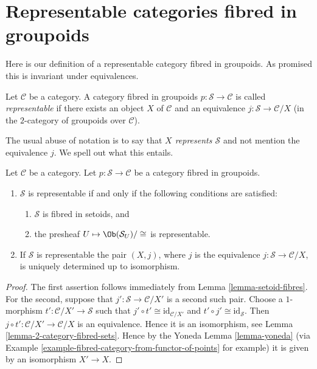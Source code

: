 \section{Representable categories fibred in groupoids}
\label{section-representable-fibred-groupoids}

\noindent
Here is our definition of a representable category fibred in groupoids.
As promised this is invariant under equivalences.

\begin{definition}
\label{definition-representable-fibred-category}
Let $\mathcal{C}$ be a category.
A category fibred in groupoids $p : \mathcal{S} \to \mathcal{C}$ is
called {\it representable} if there exists an object
$X$ of $\mathcal{C}$ and an equivalence $j : \mathcal{S} \to \mathcal{C}/X$
(in the $2$-category of groupoids over $\mathcal{C}$).
\end{definition}

\noindent
The usual abuse of notation is to say that {\it $X$ represents $\mathcal{S}$}
and not mention the equivalence $j$. We spell out what this entails.

\begin{lemma}
\label{lemma-characterize-representable-fibred-category}
Let $\mathcal{C}$ be a category.
Let $p : \mathcal{S} \to \mathcal{C}$ be a category fibred in groupoids.
\begin{enumerate}
\item $\mathcal{S}$ is representable if and only if
the following conditions are satisfied:
\begin{enumerate}
\item $\mathcal{S}$ is fibred in setoids, and
\item the presheaf $U \mapsto \Ob(\mathcal{S}_U)/\cong$ is
representable.
\end{enumerate}
\item If $\mathcal{S}$ is representable the pair $(X, j)$, where $j$ is the
equivalence $j : \mathcal{S} \to \mathcal{C}/X$, is uniquely determined
up to isomorphism.
\end{enumerate}
\end{lemma}

\begin{proof}
The first assertion follows immediately from
Lemma \ref{lemma-setoid-fibres}.
For the second, suppose that $j' : \mathcal{S} \to \mathcal{C}/X'$ is
a second such pair. Choose a $1$-morphism
$t' : \mathcal{C}/X' \to \mathcal{S}$ such that
$j' \circ t' \cong \text{id}_{\mathcal{C}/X'}$ and
$t' \circ j' \cong \text{id}_\mathcal{S}$. Then
$j \circ t' : \mathcal{C}/X' \to \mathcal{C}/X$ is an equivalence.
Hence it is an isomorphism, see Lemma \ref{lemma-2-category-fibred-sets}.
Hence by the Yoneda Lemma \ref{lemma-yoneda} (via
Example \ref{example-fibred-category-from-functor-of-points} for example)
it is given by an isomorphism $X' \to X$.
\end{proof}

